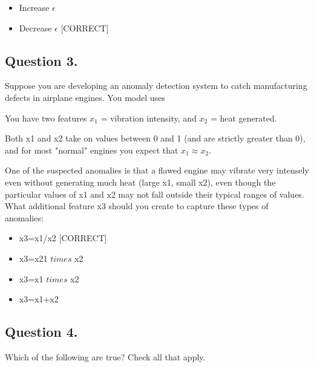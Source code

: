 \documentclass[11pt]{article} %
\begin{document}
\begin{itemize}
	\item Increase $\epsilon$ 
	\item Decrease $\epsilon$ [CORRECT]
\end{itemize}

\subsection*{Question 3. }
Suppose you are developing an anomaly detection system to catch manufacturing defects in airplane engines. You model uses


You have two features $x_1$ = vibration intensity, and $x_2$ = heat generated. 

Both x1 and x2 take on values between 0 and 1 (and are strictly greater than 0), and for most "normal" engines you expect that $x_1 \approx x_2$. 

One of the suspected anomalies is that a flawed engine may vibrate very intensely even without generating much heat (large x1, small x2), even though the particular values of x1 and x2 may not fall outside their typical ranges of values. What additional feature x3 should you create to capture these types of anomalies:

\begin{itemize}
	\item x3=x1/x2 [CORRECT]
	
	\item x3=x21 $times$ x2
	
	\item x3=x1 $times$ x2
	
	\item  x3=x1+x2
	
\end{itemize}

\subsection*{Question 4. }
Which of the following are true? Check all that apply.
\end{document}
